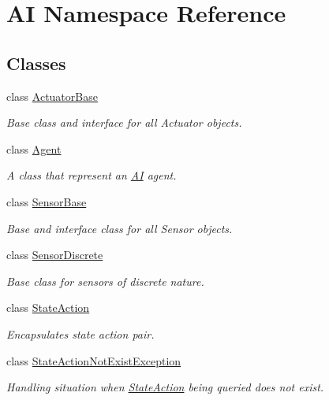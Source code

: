 \hypertarget{namespaceAI}{\section{A\+I Namespace Reference}
\label{namespaceAI}
}
\subsection*{Classes}
\begin{DoxyCompactItemize}
\item 
class \hyperlink{classAI_1_1ActuatorBase}{Actuator\+Base}
\begin{DoxyCompactList}\small\item\em Base class and interface for all Actuator objects. \end{DoxyCompactList}\item 
class \hyperlink{classAI_1_1Agent}{Agent}
\begin{DoxyCompactList}\small\item\em A class that represent an \hyperlink{namespaceAI}{A\+I} agent. \end{DoxyCompactList}\item 
class \hyperlink{classAI_1_1SensorBase}{Sensor\+Base}
\begin{DoxyCompactList}\small\item\em Base and interface class for all Sensor objects. \end{DoxyCompactList}\item 
class \hyperlink{classAI_1_1SensorDiscrete}{Sensor\+Discrete}
\begin{DoxyCompactList}\small\item\em Base class for sensors of discrete nature. \end{DoxyCompactList}\item 
class \hyperlink{classAI_1_1StateAction}{State\+Action}
\begin{DoxyCompactList}\small\item\em Encapsulates state action pair. \end{DoxyCompactList}\item 
class \hyperlink{classAI_1_1StateActionNotExistException}{State\+Action\+Not\+Exist\+Exception}
\begin{DoxyCompactList}\small\item\em Handling situation when \hyperlink{classAI_1_1StateAction}{State\+Action} being queried does not exist. \end{DoxyCompactList}\item 

\end{DoxyCompactItemize}
